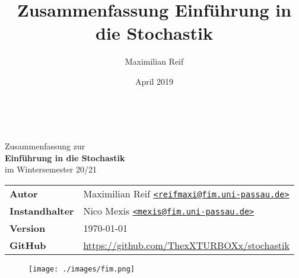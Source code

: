 \documentclass[11pt,a4paper,ngerman]{article}
\date{April 2019}
\author{Maximilian Reif}
\title{Zusammenfassung Einführung in die Stochastik}
\begin{document}
\begin{titlepage}
    \ \newline\newline\newline\newline\newline

  \begin{center}

  \huge Zusammenfassung zur\\
  \Huge\textbf{Einführung in die Stochastik}\\
  \huge im Wintersemester 20/21\\
  \normalsize

  \vspace{1cm}
  \begin{tabular}[b]{l|l}
  \textbf{Autor}         & Maximilian Reif
    \texttt{\href{mailto:reifmaxi@fim.uni-passau.de}{<reifmaxi@fim.uni-passau.de>}} \\
  \textbf{Instandhalter} & Nico Mexis
    \texttt{\href{mailto:mexis@fim.uni-passau.de}{<mexis@fim.uni-passau.de>}} \\
  \textbf{Version}       & \today \\
  \textbf{GitHub}        & \url{https://github.com/ThexXTURBOXx/stochastik}
  \end{tabular}
  \vspace{1cm}

  \end{center}

  \tableofcontents

  \begin{figure}[b]
  \centering
  \texttt{[image: ./images/fim.png]}
  \end{figure}


\end{titlepage}

\setcounter{page}{1}






\end{document}
